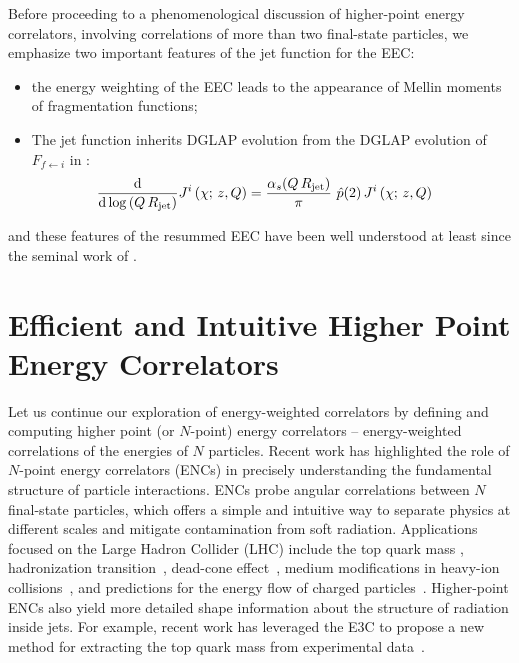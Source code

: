 Before proceeding to a phenomenological discussion of higher-point energy correlators, involving correlations of more than two final-state particles, we emphasize two important features of the jet function for the EEC:
\begin{itemize}
    \item
    the energy weighting of the EEC leads to the appearance of Mellin moments of fragmentation functions;

    \item
    The jet function inherits DGLAP evolution from the DGLAP evolution of \(F_{f \leftarrow i}\) in :
    \begin{align}
        \frac{\dd}{\dd\log\left(Q\,R_\text{jet}\right)}
        J^i\left(\chi;\, z,Q\right)
        &=
        \frac{\alpha_s(Q\,R_\text{jet})}{\pi}
        \,\,
        \hat{p}(2)
        \,
        J^i\left(\chi;\, z,Q\right)
    \end{align}
\end{itemize}
%
 and these features of the resummed EEC have been well understood at least since the seminal work of .





\section{Efficient and Intuitive Higher Point Energy Correlators}
\label{sec:new-angles}

Let us continue our exploration of energy-weighted correlators by defining and computing higher point (or $N$-point) energy correlators -- energy-weighted correlations of the energies of $N$ particles.
%
Recent work has highlighted the role of $N$-point energy correlators (ENCs) in precisely understanding the fundamental structure of particle interactions.
%
ENCs probe angular correlations between $N$ final-state particles, which offers a simple and intuitive way to separate physics at different scales and mitigate contamination from soft radiation.
%
Applications focused on the Large Hadron Collider (LHC) include the top quark mass \cite{Holguin:2022epo, Holguin:2023bjf, Holguin:2024tkz}, hadronization transition~\cite{Komiske:2022enw, Lee:2024esz}, dead-cone effect~\cite{Craft:2022kdo}, medium modifications in heavy-ion collisions~\cite{Andres:2022ovj, Andres:2023xwr, Barata:2023zqg, Andres:2023ymw, Singh:2024vwb, CMS:2024ovv, Bossi:2024qho}, and predictions for the energy flow of charged particles~\cite{Li:2021zcf, Chen:2022muj, Chen:2022pdu, Jaarsma:2023ell}.
%
Higher-point ENCs also yield more detailed shape information about the structure of radiation inside jets.
%
For example, recent work has leveraged the E3C to propose a new method for extracting the top quark mass from experimental data~\cite{Holguin:2022epo, Holguin:2023bjf, Holguin:2024tkz}.




